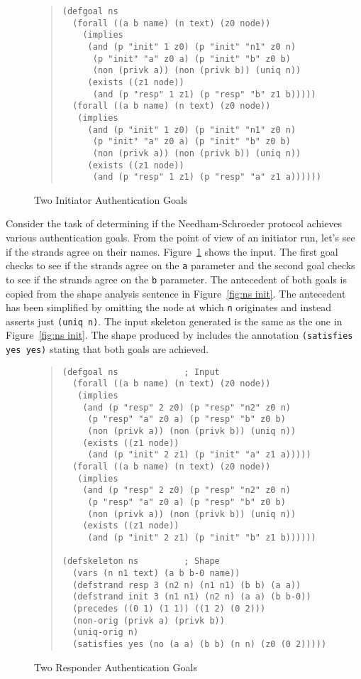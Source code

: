 \documentclass[12pt]{article}
\begin{document}
\begin{figure}
\begin{quote}
\begin{verbatim}
(defgoal ns
  (forall ((a b name) (n text) (z0 node))
    (implies
     (and (p "init" 1 z0) (p "init" "n1" z0 n)
      (p "init" "a" z0 a) (p "init" "b" z0 b)
      (non (privk a)) (non (privk b)) (uniq n))
     (exists ((z1 node))
      (and (p "resp" 1 z1) (p "resp" "b" z1 b)))))
  (forall ((a b name) (n text) (z0 node))
   (implies
     (and (p "init" 1 z0) (p "init" "n1" z0 n)
      (p "init" "a" z0 a) (p "init" "b" z0 b)
      (non (privk a)) (non (privk b)) (uniq n))
     (exists ((z1 node))
      (and (p "resp" 1 z1) (p "resp" "a" z1 a))))))
\end{verbatim}
\end{quote}
\caption{Two Initiator Authentication Goals}\label{fig:ns init goals}
\end{figure}

Consider the task of determining if the Needham-Schroeder protocol
achieves various authentication goals.  From the point of view of an
initiator run, let's see if the strands agree on their names.
Figure~\ref{fig:ns init goals} shows the input.  The first goal checks
to see if the strands agree on the \texttt{a} parameter and the second
goal checks to see if the strands agree on the \texttt{b} parameter.
The antecedent of both goals is copied from the shape analysis
sentence in Figure~\ref{fig:ns init}.  The antecedent has been
simplified by omitting the node at which \texttt{n} originates and
instead asserts just \texttt{(uniq n)}.  The input skeleton generated
is the same as the one in Figure~\ref{fig:ns init}.  The shape
produced by {\cpsa} includes the annotation \texttt{(satisfies yes
  yes)} stating that both goals are achieved.

\begin{figure}
\begin{quote}
\begin{verbatim}
(defgoal ns             ; Input
  (forall ((a b name) (n text) (z0 node))
   (implies
    (and (p "resp" 2 z0) (p "resp" "n2" z0 n)
     (p "resp" "a" z0 a) (p "resp" "b" z0 b)
     (non (privk a)) (non (privk b)) (uniq n))
    (exists ((z1 node))
     (and (p "init" 2 z1) (p "init" "a" z1 a)))))
  (forall ((a b name) (n text) (z0 node))
   (implies
    (and (p "resp" 2 z0) (p "resp" "n2" z0 n)
     (p "resp" "a" z0 a) (p "resp" "b" z0 b)
     (non (privk a)) (non (privk b)) (uniq n))
    (exists ((z1 node))
     (and (p "init" 2 z1) (p "init" "b" z1 b))))))

(defskeleton ns         ; Shape
  (vars (n n1 text) (a b b-0 name))
  (defstrand resp 3 (n2 n) (n1 n1) (b b) (a a))
  (defstrand init 3 (n1 n1) (n2 n) (a a) (b b-0))
  (precedes ((0 1) (1 1)) ((1 2) (0 2)))
  (non-orig (privk a) (privk b))
  (uniq-orig n)
  (satisfies yes (no (a a) (b b) (n n) (z0 (0 2)))))
\end{verbatim}
\end{quote}
\caption{Two Responder Authentication Goals}\label{fig:ns resp goals}
\end{figure}
\end{document}
